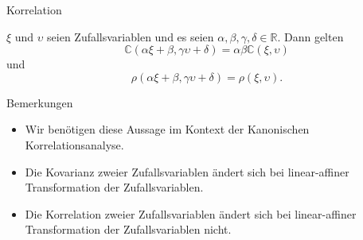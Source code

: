 \documentclass[
  8pt,
  ignorenonframetext,
]{beamer}
\providecommand{\tightlist}{%
  \setlength{\itemsep}{0pt}\setlength{\parskip}{0pt}}
\begin{document}
\begin{frame}{Korrelation}
\protect\hypertarget{korrelation-9}{}
\footnotesize
\begin{theorem}
\justifying
\normalfont
$\xi$ und $\upsilon$ seien Zufallsvariablen und es seien $\alpha,\beta,\gamma,\delta \in \mathbb{R}$. 
Dann gelten
\begin{equation}
\mathbb{C}(\alpha\xi + \beta, \gamma\upsilon + \delta) = \alpha\beta\mathbb{C}(\xi,\upsilon)
\end{equation}
und
\begin{equation}
\rho(\alpha\xi + \beta, \gamma\upsilon + \delta) = \rho(\xi,\upsilon).
\end{equation}
\end{theorem}

Bemerkungen

\begin{itemize}
\tightlist
\item
  Wir benötigen diese Aussage im Kontext der Kanonischen
  Korrelationsanalyse.
\item
  Die Kovarianz zweier Zufallsvariablen ändert sich bei linear-affiner
  Transformation der Zufallsvariablen.
\item
  Die Korrelation zweier Zufallsvariablen ändert sich bei linear-affiner
  Transformation der Zufallsvariablen nicht.
\end{itemize}
\end{frame}
\end{document}
